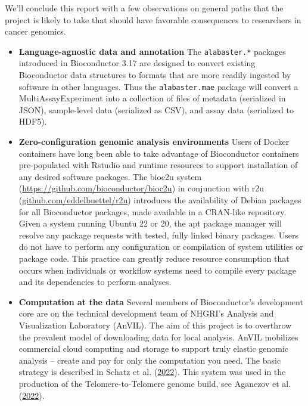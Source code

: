 We'll conclude this report with a few observations on
general paths that the project is likely to take that
should have favorable consequences to researchers in
cancer genomics.

\begin{itemize}
\item
  \textbf{Language-agnostic data and annotation} The \texttt{alabaster.*} packages
  introduced in Bioconductor 3.17 are designed to convert existing
  Bioconductor data structures to formats that are more readily ingested
  by software in other languages. Thus the \texttt{alabaster.mae}
  package will convert a MultiAssayExperiment into a collection
  of files of metadata (serialized in JSON), sample-level data
  (serialized as CSV), and assay data (serialized to HDF5).
\item
  \textbf{Zero-configuration genomic analysis environments} Users
  of Docker containers have long been able to take advantage of
  Bioconductor containers pre-populated with Rstudio and runtime
  resources to support installation of any desired software packages.
  The bioc2u system (\url{https://github.com/bioconductor/bioc2u}) in conjunction
  with r2u (\url{github.com/eddelbuettel/r2u}) introduces the
  availability of Debian packages for all Bioconductor packages,
  made available in a CRAN-like repository. Given a system running
  Ubuntu 22 or 20, the apt package manager will resolve any package
  requests with tested, fully linked binary packages. Users do not
  have to perform any configuration or compilation of system
  utilities or package code. This practice can greatly reduce
  resource consumption that occurs when individuals or
  workflow systems need to compile
  every package and its dependencies to perform analyses.
\item
  \textbf{Computation at the data} Several members of Bioconductor's
  development core are on the technical development team of
  NHGRI's Analysis and Visualization Laboratory (AnVIL). The aim
  of this project is to overthrow the prevalent model of downloading data for
  local analysis. AnVIL mobilizes commercial cloud computing and
  storage to support truly elastic genomic analysis -- create and
  pay for only the computation you need. The basic
  strategy is described in Schatz et al. (\protect\hyperlink{ref-Schatz2022}{2022}). This system was
  used in the production of the Telomere-to-Telomere
  genome build, see Aganezov et al. (\protect\hyperlink{ref-Aganezov2022}{2022}).
\end{itemize}


